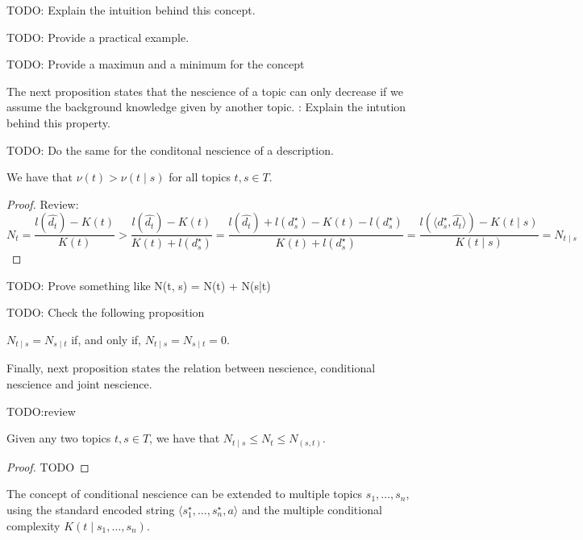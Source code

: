 {\color{red} TODO: Explain the intuition behind this concept.}

{\color{red} TODO: Provide a practical example.}

{\color{red} TODO: Provide a maximun and a minimum for the concept}

The next proposition states that the nescience of a topic can only decrease if we assume the background knowledge given by another topic. {\color{red}: Explain the intution behind this property.}

{\color{red} TODO: Do the same for the conditonal nescience of a description.}

\begin{proposition}
We have that $\nu(t) > \nu(t \mid s)$ for all topics $t, s \in T$.
\end{proposition}
\begin{proof}
{\color{red} Review:}
\[
N_t = \frac{l\left(\hat{d_t}\right) - K(t)}{K(t)} > \frac{l\left(\hat{d_t}\right) - K(t)}{K(t) + l\left(d_s^\star \right)} = \frac{l\left(\hat{d_t}\right) + l\left(d_s^\star \right) - K(t) - l\left(d_s^\star \right)}{K(t) + l\left(d_s^\star \right)} = \frac{l\left(\langle d_s^\star, \hat{d_t} \rangle \right)-K(t \mid s)}{K(t \mid s)} = N_{t \mid s}
\]
\end{proof}

{\color{red} TODO: Prove something like N(t, s) = N(t) + N(s|t)}

{\color{red} TODO: Check the following proposition}

\begin{proposition}
$N_{t \mid s} = N_{s \mid t}$ if, and only if, $N_{t \mid s} = N_{s \mid t} = 0$.
\end{proposition}

Finally, next proposition states the relation between nescience, conditional nescience and joint nescience.

{\color{red} TODO:review}

\begin{proposition}
Given any two topics $t, s \in T$, we have that $N_{t \mid s} \leq N_{t} \leq N_{(s, t)}$.
\end{proposition}
\begin{proof}
{\color{red} TODO}
\end{proof}

The concept of conditional nescience can be extended to multiple topics $s_1, \ldots, s_n$, using the standard encoded string $\langle s_1^\star, \ldots, s_n^\star, a \rangle$ and the multiple conditional complexity $K (t \mid s_1, \ldots, s_n)$.

